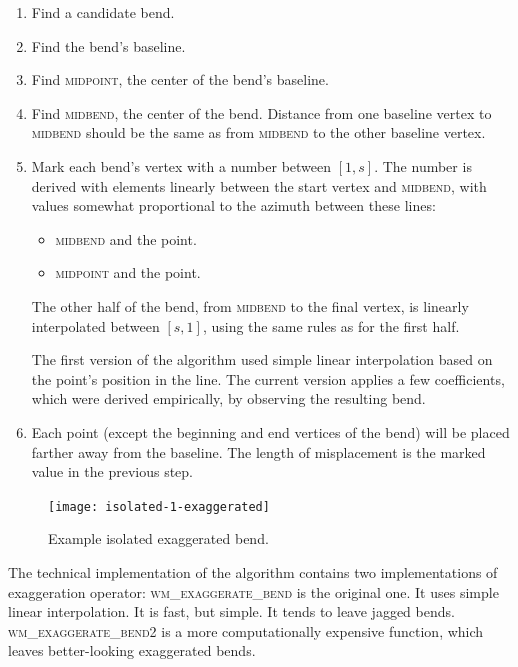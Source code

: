 \documentclass[a4paper]{article}
\begin{document}
\begin{enumerate}
    \item Find a candidate bend.
    \item Find the bend's baseline.
    \item Find \textsc{midpoint}, the center of the bend's baseline.

    \item Find \textsc{midbend}, the center of the bend. Distance from one
        baseline vertex to \textsc{midbend} should be the same as from
        \textsc{midbend} to the other baseline vertex.

    \item Mark each bend's vertex with a number between $[1,s]$. The number is
        derived with elements linearly between the start vertex and
        \textsc{midbend}, with values somewhat proportional to the azimuth
        between these lines:

        \begin{itemize}
            \item \textsc{midbend} and the point.
            \item \textsc{midpoint} and the point.
        \end{itemize}

        The other half of the bend, from \textsc{midbend} to the final vertex,
        is linearly interpolated between $[s,1]$, using the same rules as for
        the first half.

        The first version of the algorithm used simple linear interpolation
        based on the point's position in the line. The current version applies
        a few coefficients, which were derived empirically, by observing the
        resulting bend.

    \item Each point (except the beginning and end vertices of the bend) will
        be placed farther away from the baseline. The length of misplacement is
        the marked value in the previous step.

\end{enumerate}

\begin{figure}[ht]
    \centering
    \texttt{[image: isolated-1-exaggerated]}
    \caption{Example isolated exaggerated bend.}
    \label{fig:isolated-1-exaggerated}
\end{figure}

The technical implementation of the algorithm contains two implementations of
exaggeration operator: \textsc{wm\_exaggerate\_bend} is the original one. It
uses simple linear interpolation. It is fast, but simple. It tends to leave
jagged bends. \textsc{wm\_exaggerate\_bend2} is a more computationally
expensive function, which leaves better-looking exaggerated bends.
\end{document}
